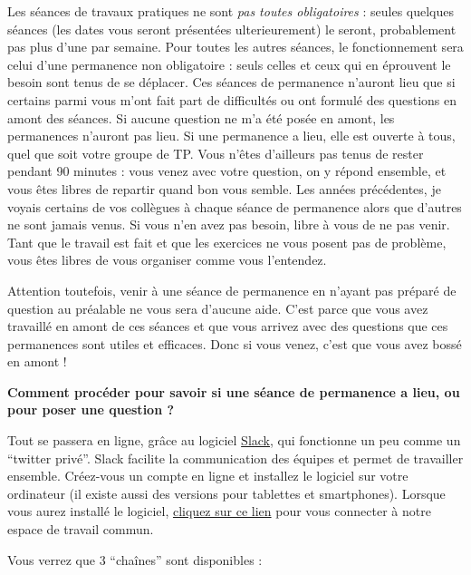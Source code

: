\documentclass[
  a4paper,
]{article}
\begin{document}
Les séances de travaux pratiques ne sont \emph{pas toutes obligatoires} : seules quelques séances (les dates vous seront présentées ulterieurement) le seront, probablement pas plus d'une par semaine. Pour toutes les autres séances, le fonctionnement sera celui d'une permanence non obligatoire : seuls celles et ceux qui en éprouvent le besoin sont tenus de se déplacer. Ces séances de permanence n'auront lieu que si certains parmi vous m'ont fait part de difficultés ou ont formulé des questions en amont des séances. Si aucune question ne m'a été posée en amont, les permanences n'auront pas lieu. Si une permanence a lieu, elle est ouverte à tous, quel que soit votre groupe de TP. Vous n'êtes d'ailleurs pas tenus de rester pendant 90 minutes : vous venez avec votre question, on y répond ensemble, et vous êtes libres de repartir quand bon vous semble. Les années précédentes, je voyais certains de vos collègues à chaque séance de permanence alors que d'autres ne sont jamais venus. Si vous n'en avez pas besoin, libre à vous de ne pas venir. Tant que le travail est fait et que les exercices ne vous posent pas de problème, vous êtes libres de vous organiser comme vous l'entendez.

Attention toutefois, venir à une séance de permanence en n'ayant pas préparé de question au préalable ne vous sera d'aucune aide. C'est parce que vous avez travaillé en amont de ces séances et que vous arrivez avec des questions que ces permanences sont utiles et efficaces. Donc si vous venez, c'est que vous avez bossé en amont !

\textbf{Comment procéder pour savoir si une séance de permanence a lieu, ou pour poser une question ?}

Tout se passera en ligne, grâce au logiciel \href{https://slack.com/intl/fr-fr/}{Slack}, qui fonctionne un peu comme un ``twitter privé''. Slack facilite la communication des équipes et permet de travailler ensemble. Créez-vous un compte en ligne et installez le logiciel sur votre ordinateur (il existe aussi des versions pour tablettes et smartphones). Lorsque vous aurez installé le logiciel, \href{https://join.slack.com/t/geel-2019/shared_invite/enQtNjkwNTA1Njk1MDcyLTdhNGM3YmM1ODhkZTMwN2Q4YzkyZDMwMzA3OGNjNzIwY2VlNDc2NjUzM2UxYmJlYjQyMjQwZmI2ZGE4YmMxNDk}{cliquez sur ce lien} pour vous connecter à notre espace de travail commun.

Vous verrez que 3 ``chaînes'' sont disponibles :
\end{document}
